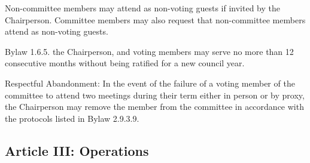 \begin{longenum}[ label*=\thesubsection.\arabic*., align=left]
\begin{longenum}[label*=\arabic*., align=left]
	\end{longenum}
\item Non-committee members may attend as non-voting guests if invited by the Chairperson. Committee members may also request that non-committee members attend as non-voting guests.
\item Bylaw 1.6.5. the Chairperson, and voting members may serve no more than 12 consecutive months without being ratified for a new council year.
\item Respectful Abandonment: In the event of the failure of a voting member of the committee to attend two meetings during their term either in person or by proxy, the Chairperson may remove the member from the committee in accordance with the protocols listed in Bylaw 2.9.3.9.
\end{longenum}

\subsection{Article III: Operations}

